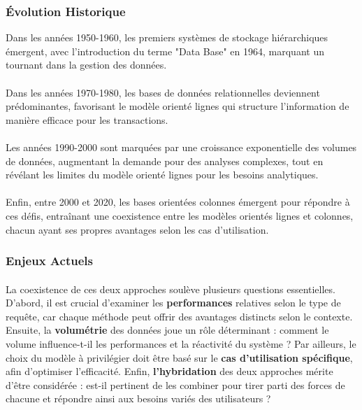 \documentclass[11pt]{extarticle}
\begin{document}
\subsubsection{Évolution Historique}

Dans les années 1950-1960, les premiers systèmes de stockage hiérarchiques émergent, avec l'introduction du terme "Data Base" en 1964, marquant un tournant dans la gestion des données. 
\paragraph{} Dans les années 1970-1980, les bases de données relationnelles deviennent prédominantes, favorisant le modèle orienté lignes qui structure l’information de manière efficace pour les transactions. 
\paragraph{} Les années 1990-2000 sont marquées par une croissance exponentielle des volumes de données, augmentant la demande pour des analyses complexes, tout en révélant les limites du modèle orienté lignes pour les besoins analytiques. 
\paragraph{} Enfin, entre 2000 et 2020, les bases orientées colonnes émergent pour répondre à ces défis, entraînant une coexistence entre les modèles orientés lignes et colonnes, chacun ayant ses propres avantages selon les cas d'utilisation.


\subsubsection{Enjeux Actuels}
\paragraph{}
La coexistence de ces deux approches soulève plusieurs questions essentielles. D'abord, il est crucial d'examiner les \textbf{performances} relatives selon le type de requête, car chaque méthode peut offrir des avantages distincts selon le contexte. Ensuite, la \textbf{volumétrie} des données joue un rôle déterminant : comment le volume influence-t-il les performances et la réactivité du système ?  Par ailleurs, le choix du modèle à privilégier doit être basé sur le \textbf{cas d'utilisation spécifique}, afin d'optimiser l'efficacité. Enfin, \textbf{l'hybridation} des deux approches mérite d'être considérée : est-il pertinent de les combiner pour tirer parti des forces de chacune et répondre ainsi aux besoins variés des utilisateurs ?
\end{document}

